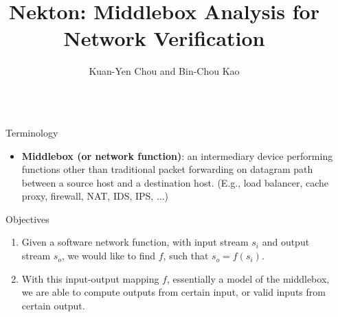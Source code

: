 \documentclass[final,hyperref={pdfpagelabels=false}]{beamer}
\title{\huge Nekton: Middlebox Analysis for Network Verification} %
\author{Kuan-Yen Chou and Bin-Chou Kao} %
\institute{CS @ UIUC} %
\begin{document}

\begin{frame}[t,fragile] %

\begin{columns}[t] %

\begin{column}{.02\textwidth}\end{column} %

\begin{column}{.465\textwidth} %


\begin{block}{Terminology}

\begin{itemize}
    \item \textbf{Middlebox (or network function)}: an intermediary device
        performing functions other than traditional packet forwarding on
        datagram path between a source host and a destination host.
        (E.g., load balancer, cache proxy, firewall, NAT, IDS, IPS, ...)
\end{itemize}

\end{block}


\begin{block}{Objectives}

\begin{enumerate}
    \item Given a software network function, with input stream $s_i$ and output
        stream $s_o$, we would like to find $f$, such that $s_o = f(s_i)$.
    \item With this input-output mapping $f$, essentially a model of the
        middlebox, we are able to compute outputs from certain input, or valid
        inputs from certain output.
\end{enumerate}


\end{block}
\end{column}
\end{columns}
\end{frame}
\end{document}
